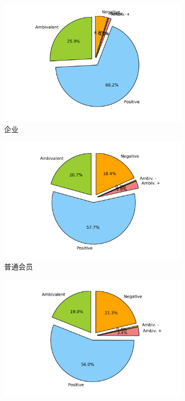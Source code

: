 \documentclass[12pt, oneside]{article}
\begin{document}
\begin{spacing}{1.5}
\begin{CJK}{UTF8}{gbsn}
\begin{figure}
\begin{subfigure}[b]{0.3\linewidth}
		\includegraphics[trim = 1.5cm 0 1.5cm 0, clip = true, width=\textwidth]{../result/charts/emotion_identification_enterprises}
		\caption{企业}
	\end{subfigure}
	\begin{subfigure}[b]{0.3\linewidth}
		\centering
		\includegraphics[trim = 1.5cm 0 1.5cm 0, clip = true, width=\textwidth]{../result/charts/emotion_identification_junior}
		\caption{普通会员}
	\end{subfigure}
	\begin{subfigure}[b]{0.3\linewidth}
		\centering
		\includegraphics[trim = 1.5cm 0 1.5cm 0, clip = true, width=\textwidth]{../result/charts/emotion_identification_senior}

\end{subfigure}
\end{figure}
\end{CJK}
\end{spacing}
\end{document}

